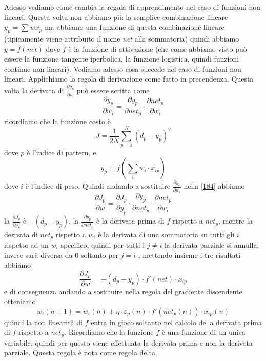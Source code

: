 \noindent Adesso vediamo come cambia la regola di apprendimento nel caso di funzioni non lineari. Questa volta non abbiamo più la semplice combinazione lineare $y_p= \sum w x_p$ ma abbiamo una funzione di questa combinazione lineare (tipicamente viene attribuito il nome \emph{net} alla sommatoria) quindi abbiamo $y=f(net)$ dove $f$ è la funzione di attivazione (che come abbiamo visto può essere la funzione tangente iperbolica, la funzione logistica, quindi funzioni continue non lineari).  Vediamo adesso cosa succede nel caso di funzioni non lineari. Applichiamo la regola di derivazione come fatto in precendenza. Questa volta la derivata di $\frac{\partial y_p}{\partial w}$ può essere scritta come 
\begin{equation}
\frac{\partial y_p}{\partial w_i} = \frac{\partial y_p}{\partial net_p} \cdot \frac{\partial net_p}{\partial w_i} 
\end{equation}
ricordiamo che la funzione costo è
\begin{equation}
J = \frac{1}{2N} \sum_{p=1}^N (d_p - y_p)^2
\end{equation}
dove $p$ è l'indice di pattern, e
\begin{equation}
y_p = f \left( \sum_i w_i \cdot x_{ip} \right)
\end{equation}
dove $i$ è l'indice di peso. Quindi andando a sostituire $\frac{\partial y_p}{\partial w_i}$ nella \ref{184} abbiamo
\begin{equation}
\frac{\partial J_p}{\partial w} = \frac{\partial J_p}{\partial y_p} \cdot \frac{\partial y_p}{\partial net_p} \cdot \frac{\partial net_p}{\partial w_i} 
\end{equation}
la  $\frac{\partial J_p}{\partial y_p}$ è $-(d_p - y_p)$, la $\frac{\partial y_p}{\partial net_p}$ è la derivata prima di $f$ rispetto a $net_p$, mentre la derivata di $net_p$ rispetto a $w_i$ è la derivata di una sommatoria su tutti gli $i$ rispetto ad un $w_i$ specifico, quindi per tutti i $j\neq i$ la derivata parziale si annulla, invece sarà diversa da 0 soltanto per $j=i$ , mettendo insieme i tre risultati abbiamo
\begin{equation}
\frac{\partial J_p}{\partial w} = -(d_p - y_p) \cdot f'(net) \cdot x_{ip}
\end{equation}
e di conseguenza andando a sostituire nella regola del gradiente discendente otteniamo
\begin{equation}
w_i(n+1) = w_i(n) + \eta \cdot \varepsilon_p (n) \cdot f'(net_p(n)) \cdot x_{ip}(n) 
\end{equation}
quindi la non linearità di $f$ entra in gioco soltanto nel calcolo della derivata prima di $f$ rispetto a $net_p$.  Ricordiamo che la funzione $f$ è una funzione di un unica variabile, quindi per questo viene effettuata la derivata prima e non la derivata parziale. Questa regola è nota come regola delta.\\

